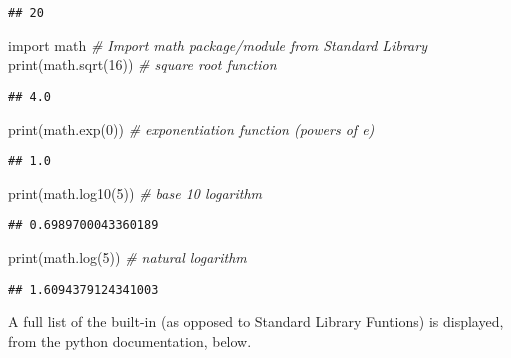 \documentclass[]{book}
\newenvironment{Shaded}{\begin{snugshade}}{\end{snugshade}}
\newcommand{\DecValTok}[1]{\textcolor[rgb]{0.00,0.00,0.81}{#1}}
\newcommand{\ImportTok}[1]{#1}
\newcommand{\CommentTok}[1]{\textcolor[rgb]{0.56,0.35,0.01}{\textit{#1}}}
\newcommand{\BuiltInTok}[1]{#1}
\newcommand{\NormalTok}[1]{#1}
\theoremstyle{definition}
\theoremstyle{definition}
\theoremstyle{definition}
\theoremstyle{remark}
\begin{document}
\begin{verbatim}
## 20
\end{verbatim}

\begin{Shaded}
\begin{Highlighting}[]
\ImportTok{import}\NormalTok{ math                     }\CommentTok{# Import math package/module from Standard Library}
\BuiltInTok{print}\NormalTok{(math.sqrt(}\DecValTok{16}\NormalTok{))            }\CommentTok{# square root function}
\end{Highlighting}
\end{Shaded}

\begin{verbatim}
## 4.0
\end{verbatim}

\begin{Shaded}
\begin{Highlighting}[]
\BuiltInTok{print}\NormalTok{(math.exp(}\DecValTok{0}\NormalTok{))              }\CommentTok{# exponentiation function (powers of e)}
\end{Highlighting}
\end{Shaded}

\begin{verbatim}
## 1.0
\end{verbatim}

\begin{Shaded}
\begin{Highlighting}[]
\BuiltInTok{print}\NormalTok{(math.log10(}\DecValTok{5}\NormalTok{))            }\CommentTok{# base 10 logarithm}
\end{Highlighting}
\end{Shaded}

\begin{verbatim}
## 0.6989700043360189
\end{verbatim}

\begin{Shaded}
\begin{Highlighting}[]
\BuiltInTok{print}\NormalTok{(math.log(}\DecValTok{5}\NormalTok{))              }\CommentTok{# natural logarithm}
\end{Highlighting}
\end{Shaded}

\begin{verbatim}
## 1.6094379124341003
\end{verbatim}

A full list of the built-in (as opposed to Standard Library Funtions) is
displayed, from the python documentation, below.
\end{document}

